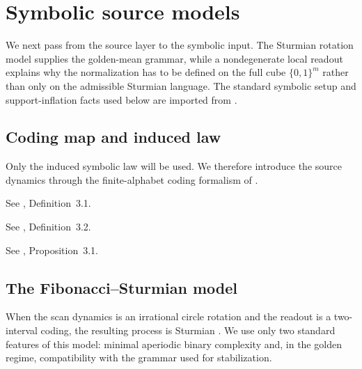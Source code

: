 \section{Symbolic source models}\label{sec:readout}

We next pass from the source layer to the symbolic input. The Sturmian rotation model supplies the golden-mean grammar, while a nondegenerate local readout explains why the normalization has to be defined on the full cube $\{0,1\}^m$ rather than only on the admissible Sturmian language. The standard symbolic setup and support-inflation facts used below are imported from \cite{MaZhang2026Nonlinearity}.

\subsection{Coding map and induced law}\label{sec:readout:maps}

Only the induced symbolic law will be used. We therefore introduce the source dynamics through the finite-alphabet coding formalism of \cite{MaZhang2026Nonlinearity}.

\begin{definition}\label{def:readout}
See \cite{MaZhang2026Nonlinearity}, Definition~3.1.
\end{definition}

\begin{definition}\label{def:coding-law}
See \cite{MaZhang2026Nonlinearity}, Definition~3.2.
\end{definition}

\begin{proposition}\label{prop:induced-law}
See \cite{MaZhang2026Nonlinearity}, Proposition~3.1.
\end{proposition}

\subsection{The Fibonacci--Sturmian model}\label{sec:readout:sturmian}

When the scan dynamics is an irrational circle rotation and the readout is a two-interval coding, the resulting process is Sturmian \cite{MorseHedlund1940,Lothaire2002,Queffelec2010}. We use only two standard features of this model: minimal aperiodic binary complexity and, in the golden regime, compatibility with the grammar used for stabilization.

